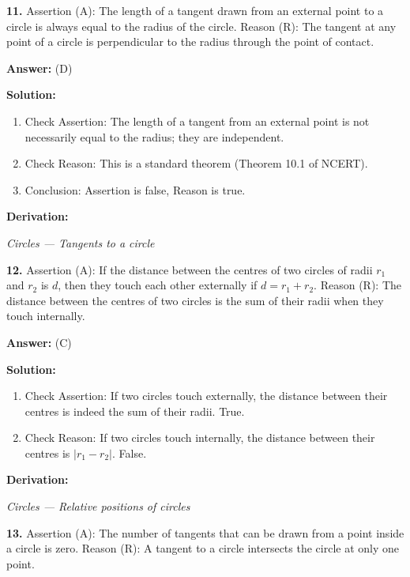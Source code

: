 \documentclass[12pt,a4paper]{exam}
\newcommand{\fitmath}[1]{%
  \sbox{\schmathbox}{$\displaystyle #1$}%
  \ifdim\wd\schmathbox>\linewidth
    \resizebox{\linewidth}{!}{\usebox{\schmathbox}}%
  \else
    \usebox{\schmathbox}%
  \fi}
\begin{document}
\begin{questions}
\question \textbf{11.} Assertion (A): The length of a tangent drawn from an external point to a circle is always equal to the radius of the circle.
Reason (R): The tangent at any point of a circle is perpendicular to the radius through the point of contact.

\textbf{Answer:}
(D)

\textbf{Solution:}
\begin{enumerate}
  \item Check Assertion: The length of a tangent from an external point is not necessarily equal to the radius; they are independent.
  \item Check Reason: This is a standard theorem (Theorem 10.1 of NCERT).
  \item Conclusion: Assertion is false, Reason is true.
\end{enumerate}
\textbf{Derivation:}
\begin{center}
\fitmath{A: \text{False}, R: \text{True}}
\end{center}
\hfill \textit{Circles — Tangents to a circle}
\vspace{0.3cm}

\question \textbf{12.} Assertion (A): If the distance between the centres of two circles of radii $r_1$ and $r_2$ is $d$, then they touch each other externally if $d = r_1 + r_2$.
Reason (R): The distance between the centres of two circles is the sum of their radii when they touch internally.

\textbf{Answer:}
(C)

\textbf{Solution:}
\begin{enumerate}
  \item Check Assertion: If two circles touch externally, the distance between their centres is indeed the sum of their radii. True.
  \item Check Reason: If two circles touch internally, the distance between their centres is $|r_1 - r_2|$. False.
\end{enumerate}
\textbf{Derivation:}
\begin{center}
\fitmath{A: \text{True}, R: \text{False}}
\end{center}
\hfill \textit{Circles — Relative positions of circles}
\vspace{0.3cm}

\question \textbf{13.} Assertion (A): The number of tangents that can be drawn from a point inside a circle is zero.
Reason (R): A tangent to a circle intersects the circle at only one point.


\end{questions}
\end{document}
